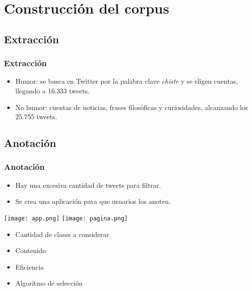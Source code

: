 \section{Construcción del corpus}

\subsection{Extracción}
\begin{frame}
    \frametitle{Extracción}

    \begin{itemize}
        \item Humor: se busca en Twitter por la palabra clave \emph{chiste} y se eligen cuentas, llegando a 16.333 tweets.
        \item No humor: cuentas de noticias, frases filosóficas y curiosidades, alcanzando los 25.755 tweets.
    \end{itemize}
\end{frame}

\subsection{Anotación}
\begin{frame}[allowframebreaks]
    \frametitle{Anotación}

    \begin{itemize}
        \item Hay una excesiva cantidad de tweets para filtrar.
        \item Se crea una aplicación para que usuarios los anoten.
    \end{itemize}

    \framebreak

    \begin{center}
        \texttt{[image: app.png]}
        \hspace{1cm}
        \texttt{[image: pagina.png]}
    \end{center}

    \framebreak

    \begin{itemize}
        \item Cantidad de clases a considerar
        \item Contenido
        \item Eficiencia
        \item Algoritmo de selección
    \end{itemize}
\end{frame}

